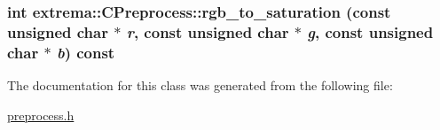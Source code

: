 \hypertarget{classextrema_1_1CPreprocess_2d7383d347633cf3613057d626bc9489}{
\subsubsection[rgb\_\-to\_\-saturation]{\setlength{\rightskip}{0pt plus 5cm}int extrema::CPreprocess::rgb\_\-to\_\-saturation (const unsigned char $\ast$ {\em r}, const unsigned char $\ast$ {\em g}, const unsigned char $\ast$ {\em b}) const}}
\label{classextrema_1_1CPreprocess_2d7383d347633cf3613057d626bc9489}




The documentation for this class was generated from the following file:\begin{CompactItemize}
\item 
\hyperlink{preprocess_8h}{preprocess.h}\end{CompactItemize}
